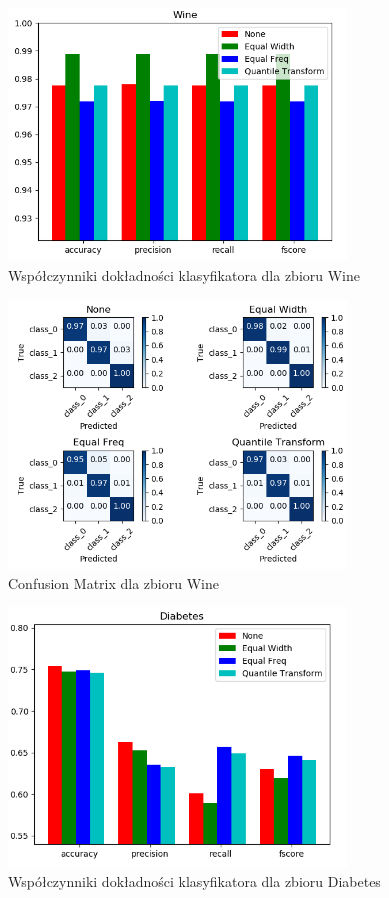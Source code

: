 \documentclass[12pt,a4paper]{article}
\begin{document}
\begin{figure}[H]
\centering
\includegraphics[width=0.8\textwidth]{tsWine.PNG}
\caption{Współczynniki dokładności klasyfikatora dla zbioru Wine}
\end{figure}

\begin{figure}[H]
\centering
\includegraphics[width=0.8\textwidth]{tmWine.PNG}
\caption{Confusion Matrix dla zbioru Wine}
\end{figure}

\begin{figure}[H]
\centering
\includegraphics[width=0.8\textwidth]{tsDiabetes.PNG}
\caption{Współczynniki dokładności klasyfikatora dla zbioru Diabetes}
\end{figure}
\end{document}

